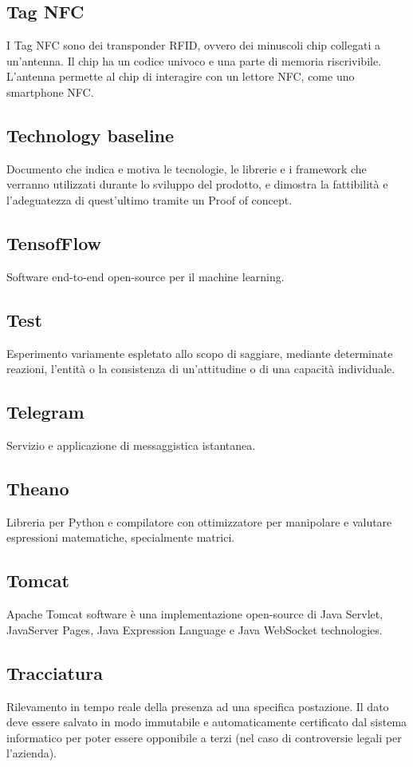 \subsection{Tag NFC} I Tag NFC sono dei transponder RFID, ovvero dei minuscoli chip collegati a un'antenna. Il chip ha un codice univoco e una parte di memoria riscrivibile. L'antenna permette al chip di interagire con un lettore NFC, come uno smartphone NFC.
\subsection{Technology baseline} Documento che indica e motiva le tecnologie, le librerie e
i framework che verranno utilizzati durante lo sviluppo del prodotto, e dimostra la fattibilità e l'adeguatezza di quest'ultimo tramite un Proof of concept.
\subsection{TensofFlow} Software end-to-end open-source per il machine learning.
\subsection{Test} Esperimento variamente espletato allo scopo di saggiare, mediante determinate reazioni, l'entità o la consistenza di un'attitudine o di una capacità individuale.
\subsection{Telegram} Servizio e applicazione di messaggistica istantanea.
\subsection{Theano} Libreria per Python e compilatore con ottimizzatore per manipolare e valutare espressioni matematiche, specialmente matrici.
\subsection{Tomcat} Apache Tomcat software è una implementazione open-source di Java Servlet, JavaServer Pages, Java Expression Language e Java WebSocket technologies.
\subsection{Tracciatura} Rilevamento in tempo reale della presenza ad una specifica
postazione. Il dato deve essere salvato in modo immutabile e automaticamente certificato dal
sistema informatico per poter essere opponibile a terzi (nel caso di controversie legali per l’azienda).
